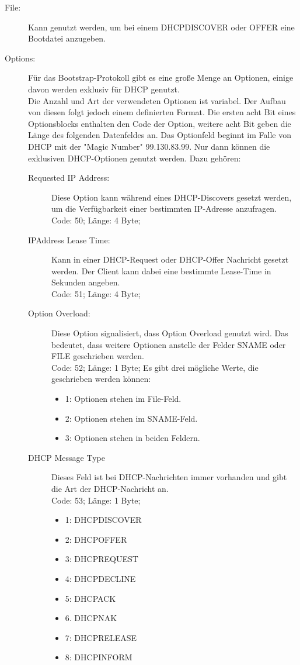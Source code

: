 \begin{description}
\item[File: ] Kann genutzt werden, um bei einem DHCPDISCOVER oder OFFER eine Bootdatei anzugeben. 
\item[Options: ] Für das Bootstrap-Protokoll gibt es eine große Menge an Optionen, einige davon werden exklusiv für DHCP genutzt. \\
Die Anzahl und Art der verwendeten Optionen ist variabel. Der Aufbau von diesen folgt jedoch einem definierten Format. Die ersten acht Bit eines Optionsblocks enthalten den Code der Option, weitere acht Bit geben die Länge des folgenden Datenfeldes an. Das Optionfeld beginnt im Falle von DHCP mit der {}"Magic Number"{} 99.130.83.99. Nur dann können die exklusiven DHCP-Optionen genutzt werden.\cite{DHCPr}
Dazu gehören:
\begin{description}
	\item[Requested IP Address:] Diese Option kann während eines DHCP-Discovers gesetzt werden, um die Verfügbarkeit einer bestimmten IP-Adresse anzufragen.\\
	Code: 50; Länge: 4 Byte;
	 
	\item[IPAddress Lease Time:] Kann in einer DHCP-Request oder DHCP-Offer Nachricht gesetzt werden. Der Client kann dabei eine bestimmte Lease-Time in Sekunden angeben.\\
	Code: 51; Länge: 4 Byte;
	
	\item[Option Overload:] Diese Option signalisiert, dass Option Overload genutzt wird. Das bedeutet, dass weitere Optionen anstelle der Felder SNAME oder FILE geschrieben werden. \\
	Code: 52; Länge: 1 Byte;
	Es gibt drei mögliche Werte, die geschrieben werden können: 
	\begin{itemize}
		\item 1: Optionen stehen im File-Feld. 
		\item 2: Optionen stehen im SNAME-Feld.
		\item 3: Optionen stehen in beiden Feldern.
	\end{itemize}
	
	\item[DHCP Message Type] Dieses Feld ist bei DHCP-Nachrichten immer vorhanden und gibt die Art der DHCP-Nachricht an. \\
	Code: 53; Länge: 1 Byte;
	\begin{itemize}
		\item 1: DHCPDISCOVER
		\item 2: DHCPOFFER
		\item 3: DHCPREQUEST
		\item 4: DHCPDECLINE
		\item 5: DHCPACK
		\item 6. DHCPNAK
		\item 7: DHCPRELEASE
		\item 8: DHCPINFORM		
		

\end{itemize}
\end{description}
\end{description}
